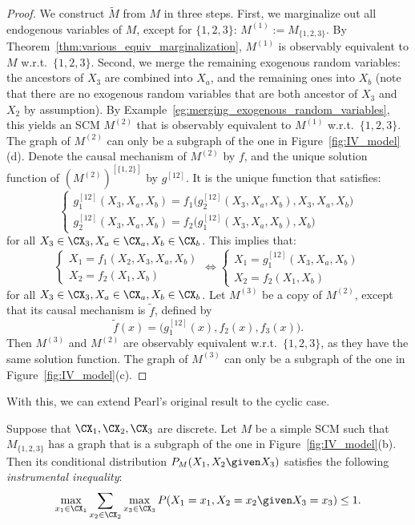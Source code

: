 \begin{proof}
  We construct $\tilde{M}$ from $M$ in three steps.
  First, we marginalize out all endogenous variables of $M$, except for $\{1,2,3\}$: $M^{(1)} := M_{\{1,2,3\}}.$
  By Theorem~\ref{thm:various_equiv_marginalization}, $M^{(1)}$ is observably equivalent to $M$ w.r.t.\ $\{1,2,3\}$.
  Second, we merge the remaining exogenous random variables: the ancestors of $X_3$ are combined into $X_a$, and the remaining ones into $X_b$ (note that there are no exogenous random variables that are both ancestor of $X_3$ and $X_2$ by assumption).
  By Example~\ref{eg:merging_exogenous_random_variables}, this yields an SCM $M^{(2)}$ that is observably equivalent to $M^{(1)}$ w.r.t.\ $\{1,2,3\}$.
  The graph of $M^{(2)}$ can only be a subgraph of the one in Figure~\ref{fig:IV_model}(d).
  Denote the causal mechanism of $M^{(2)}$ by $f$, and the unique solution function of $(M^{(2)})^{[\{1,2\}]}$ by $g^{[12]}$.
  It is the unique function that satisfies:
  \begin{equation*}
    \begin{cases}
      g^{[12]}_1(X_3,X_a,X_b) = f_1\big(g^{[12]}_2(X_3,X_a,X_b),X_3,X_a,X_b\big) \\
      g^{[12]}_2(X_3,X_a,X_b) = f_2\big(g^{[12]}_1(X_3,X_a,X_b),X_b\big)
    \end{cases}
  \end{equation*}
  for all $X_3 \in \CX_3,X_a \in \CX_a,X_b \in \CX_b$. This implies that:
  \begin{equation*}
  \begin{cases}
    X_1 = f_1(X_2,X_3,X_a,X_b) \\
    X_2 = f_2(X_1,X_b)
  \end{cases} \iff
  \begin{cases}
    X_1 = g^{[12]}_1(X_3,X_a,X_b) \\
    X_2 = f_2(X_1,X_b)
  \end{cases} 
  \end{equation*}
  for all $X_3 \in \CX_3,X_a \in \CX_a,X_b \in \CX_b$.
  Let $M^{(3)}$ be a copy of $M^{(2)}$, except that its causal mechanism is $\tilde{f}$, defined by
  $$\tilde{f}(x) = \big(g^{[12]}_1(x), f_2(x), f_3(x)\big).$$
  Then $M^{(3)}$ and $M^{(2)}$ are observably equivalent w.r.t.\ $\{1,2,3\}$, as they have the same solution function.
  The graph of $M^{(3)}$ can only be a subgraph of the one in Figure~\ref{fig:IV_model}(c).
\end{proof}
With this, we can extend Pearl's original result to the cyclic case.
\begin{Prp}\label{prp:instrumental_inequality}
  Suppose that $\CX_1, \CX_2, \CX_3$ are discrete. 
  Let $M$ be a simple SCM such that $M_{\{1,2,3\}}$ has a graph that is a subgraph of the one in Figure~\ref{fig:IV_model}(b). 
  Then its conditional distribution $P_M(X_1,X_2 \given X_3)$ satisfies the following \emph{instrumental inequality}:
  \begin{equation}\label{eq:instrumental_inequality}
  \max_{x_1\in\CX_1} \sum_{x_2\in\CX_2} \max_{x_3\in\CX_3} P(X_1=x_1,X_2=x_2 \given X_3=x_3) \le 1.
  \end{equation}
\end{Prp}
